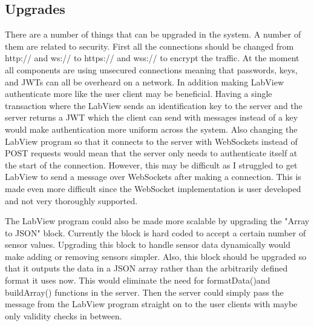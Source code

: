 \documentclass[10pt,technote]{IEEEtran}
\begin{document}
\subsection{Upgrades}
There are a number of things that can be upgraded in the system. A number of them are related to security. First all the connections should be changed from http:// and ws:// to https:// and wss:// to encrypt the traffic. At the moment all components are using unsecured connections meaning that passwords, keys, and JWTs can all be overheard on a network. In addition making LabView authenticate more like the user client may be beneficial. Having a single transaction where the LabView sends an identification key to the server and the server returns a JWT which the client can send with messages instead of a key would make authentication more uniform across the system. Also changing the LabView program so that it connects to the server with WebSockets instead of POST requests would mean that the server only needs to authenticate itself at the start of the connection. However, this may be difficult as I struggled to get LabView to send a message over WebSockets after making a connection. This is made even more difficult since the WebSocket implementation is user developed and not very thoroughly supported.
\par
The LabView program could also be made more scalable by upgrading the "Array to JSON" block. Currently the block is hard coded to accept a certain number of sensor values. Upgrading this block to handle sensor data dynamically would make adding or removing sensors simpler. Also, this block should be upgraded so that it outputs the data in a JSON array rather than the arbitrarily defined format it uses now. This would eliminate the need for formatData()and buildArray() functions in the server. Then the server could simply pass the message from the LabView program straight on to the user clients with maybe only validity checks in between.
\end{document}
